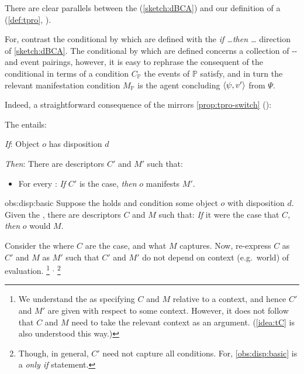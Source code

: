 \begin{note}
  There are clear parallels between the  (\autoref{sketch:dBCA}) and our definition of a \tpro{} (\autoref{def:tpro}, ).


  \noindent%
  For, contrast the conditional by which  are defined with the \emph{if \dots then \dots} direction of \autoref{sketch:dBCA}.
  The conditional by which  are defined concerns a collection of -- and event pairings, however, it is easy to rephrase the consequent of the conditional in terms of a condition \(C_{\mathbb{P}}\) the events of \(\mathbb{P}\) satisfy, and in turn the relevant manifestation condition \(M_{\mathbb{P}}\) is the agent concluding \(\langle\psi, v'\rangle\) from \(\Psi\).
\end{note}


\begin{note}
  Indeed, a straightforward consequence of the  mirrors \autoref{prop:tpro-switch} ():

  \begin{proposition}%
    \label{obs:disp:basic}%
    The  entails:

    \begin{itenum}
    \item[\emph{If}:]
      Object \(o\) has disposition \(d\)
    \item[\emph{Then}:]
      There are descriptors \(C'\) and \(M'\) such that:
      \begin{itemize}
      \item
        For every :
        \emph{If} \(C'\) is the case, \emph{then} \(o\) manifests \(M'\).
      \end{itemize}
    \end{itenum}
    \vspace{-\baselineskip}
  \end{proposition}

  \begin{argument}{obs:disp:basic}
    Suppose the  holds and condition some object \(o\) with disposition \(d\).
    Given the , there are descriptors \(C\) and \(M\) such that:
    \emph{If} it were the case that \(C\), \emph{then} \(o\) would \(M\).

    Consider the  where \(C\) are the case, and what \(M\) captures.
    Now, re-express \(C\) as \(C'\) and \(M\) as \(M'\) such that \(C'\) and \(M'\) do not depend on context (e.g.\ world) of evaluation.%
    \footnote{
      We understand the \dBCAa{} as specifying \(C\) and \(M\) relative to a context, and hence \(C'\) and \(M'\) are given with respect to some context.
      However, it does not follow that \(C\) and \(M\) need to take the relevant context as an argument.
      (\autoref{idea:tC} is also understood this way.)
    }%
    \(^{,}\)%
    \footnote{
      Though, in general, \(C'\) need not capture all conditions.
      For, \autoref{obs:disp:basic} is a \emph{only if} statement.
    }
  \end{argument}
\end{note}


